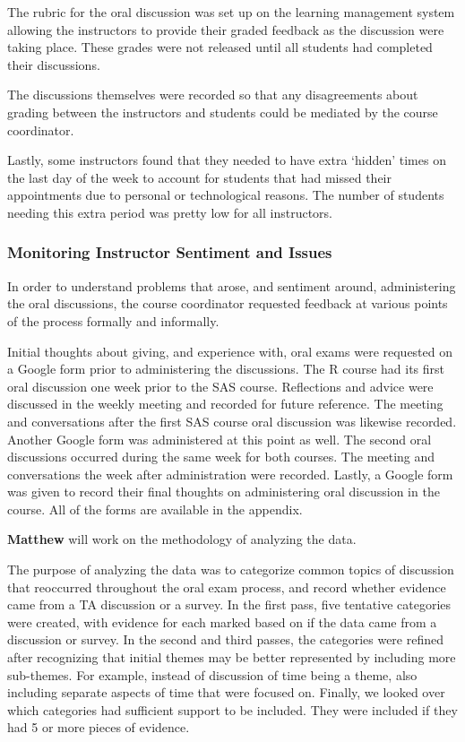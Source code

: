 \documentclass[
  letterpaper,
  DIV=11,
  numbers=noendperiod]{scrartcl}
\begin{document}
The rubric for the oral discussion was set up on the learning management
system allowing the instructors to provide their graded feedback as the
discussion were taking place. These grades were not released until all
students had completed their discussions.

The discussions themselves were recorded so that any disagreements about
grading between the instructors and students could be mediated by the
course coordinator.

Lastly, some instructors found that they needed to have extra `hidden'
times on the last day of the week to account for students that had
missed their appointments due to personal or technological reasons. The
number of students needing this extra period was pretty low for all
instructors.

\hypertarget{monitoring-instructor-sentiment-and-issues}{%
\subsubsection{Monitoring Instructor Sentiment and
Issues}\label{monitoring-instructor-sentiment-and-issues}}

In order to understand problems that arose, and sentiment around,
administering the oral discussions, the course coordinator requested
feedback at various points of the process formally and informally.

Initial thoughts about giving, and experience with, oral exams were
requested on a Google form prior to administering the discussions. The R
course had its first oral discussion one week prior to the SAS course.
Reflections and advice were discussed in the weekly meeting and recorded
for future reference. The meeting and conversations after the first SAS
course oral discussion was likewise recorded. Another Google form was
administered at this point as well. The second oral discussions occurred
during the same week for both courses. The meeting and conversations the
week after administration were recorded. Lastly, a Google form was given
to record their final thoughts on administering oral discussion in the
course. All of the forms are available in the appendix.

\textbf{Matthew} will work on the methodology of analyzing the data.

The purpose of analyzing the data was to categorize common topics of
discussion that reoccurred throughout the oral exam process, and record
whether evidence came from a TA discussion or a survey. In the first
pass, five tentative categories were created, with evidence for each
marked based on if the data came from a discussion or survey. In the
second and third passes, the categories were refined after recognizing
that initial themes may be better represented by including more
sub-themes. For example, instead of discussion of time being a theme,
also including separate aspects of time that were focused on. Finally,
we looked over which categories had sufficient support to be included.
They were included if they had 5 or more pieces of evidence.
\end{document}
